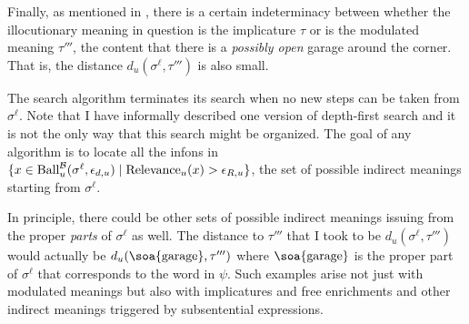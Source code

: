 



Finally, as mentioned in , there is a certain indeterminacy between whether the illocutionary meaning in question is the implicature $\tau$ or is the modulated meaning $\tau'''$, the content that there is a \emph{possibly open} garage around the corner. That is, the distance $d_u(\sigma^\ell, \tau''')$ is also small. 


The search algorithm terminates its search when no new steps can be taken from $\sigma^\ell$. Note that I have informally described one version of depth-first search and it is not the only way that this search might be organized. The goal of any algorithm is to locate all the infons in $\{ x \in \hbox{Ball}^{\cal B}_u(\sigma^{\ell}, \epsilon_{d,u}) \mid  \hbox{Relevance}_u(x) > \epsilon_{R,u} \}$, the set of possible indirect meanings starting from $\sigma^\ell$. 


In principle, there could be other sets of possible indirect meanings  issuing from the proper \emph{parts} of $\sigma^\ell$ as well. The distance to $\tau'''$ that I took to be $d_u(\sigma^\ell, \tau''')$ would actually be $d_u(\soa{\hbox{garage}}, \tau''')$ where $\soa{\hbox{garage}}$ is the proper part of $\sigma^\ell$ that corresponds to the word  in $\psi$. Such examples arise not just with modulated meanings but also with implicatures and free enrichments and other indirect meanings triggered by subsentential expressions.

